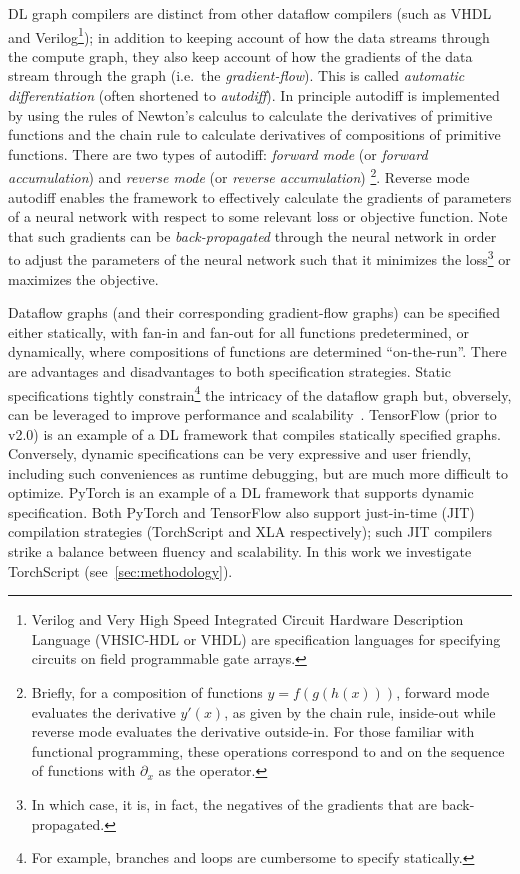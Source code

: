 


DL graph compilers are distinct from other dataflow compilers (such as VHDL and Verilog\footnote{Verilog and Very High Speed Integrated Circuit Hardware Description Language (VHSIC-HDL or VHDL) are specification languages for specifying circuits on field programmable gate arrays.}); in addition to keeping account of how the data streams through the compute graph, they also keep account of how the gradients of the data stream through the graph (i.e.\ the \textit{gradient-flow}).
This is called \textit{automatic differentiation} (often shortened to \textit{autodiff}).
In principle autodiff is implemented by using the rules of Newton's calculus to calculate the derivatives of primitive functions and the chain rule to calculate derivatives of compositions of primitive functions.
There are two types of autodiff: \textit{forward mode} (or \textit{forward accumulation}) and \textit{reverse mode} (or \textit{reverse accumulation})%
\footnote{Briefly, for a composition of functions $y=f(g(h(x)))$, forward mode evaluates the derivative $y'(x)$, as given by the chain rule, inside-out while reverse mode evaluates the derivative outside-in. For those familiar with functional programming, these operations correspond to  and  on the sequence of functions with $\partial_x$ as the operator.}.
Reverse mode autodiff enables the framework to effectively calculate the gradients of parameters of a neural network with respect to some relevant loss or objective function.
Note that such gradients can be \textit{back-propagated} through the neural network in order to adjust the parameters of the neural network such that it minimizes the loss\footnote{In which case, it is, in fact, the negatives of the gradients that are back-propagated.} or maximizes the objective.

Dataflow graphs (and their corresponding gradient-flow graphs) can be specified either statically, with fan-in and fan-out for all functions predetermined, or dynamically, where compositions of functions are determined ``on-the-run''.
There are advantages and disadvantages to both specification strategies.
Static specifications tightly constrain\footnote{For example, branches and loops are cumbersome to specify statically.} the intricacy of the dataflow graph but, obversely, can be leveraged to improve performance and scalability~\cite{le2019tflms,Pradelle2017PolyhedralOO}.
TensorFlow (prior to v2.0) is an example of a DL framework that compiles statically specified graphs.
Conversely, dynamic specifications can be very expressive and user friendly, including such conveniences as runtime debugging, but are much more difficult to optimize.
PyTorch is an example of a DL framework that supports dynamic specification.
Both PyTorch and TensorFlow also support just-in-time (JIT) compilation strategies (TorchScript and XLA respectively);
such JIT compilers strike a balance between fluency and scalability.
In this work we investigate TorchScript (see~\cref{sec:methodology}).

